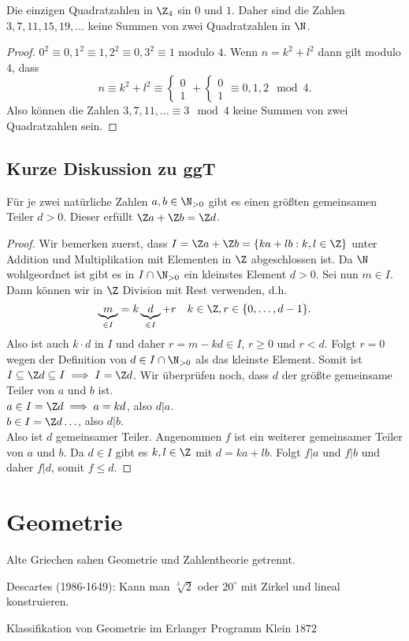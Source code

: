 \begin{lemma}
	Die einzigen Quadratzahlen in $\Z_4$ sin $0$ und $1$.
	Daher sind die Zahlen $3,7,11,15,19,\ldots$ keine Summen von zwei Quadratzahlen in $\N$.
\end{lemma}

\begin{proof}
	$0^2 \equiv 0, 1^2 \equiv 1, 2^2 \equiv 0, 3^2 \equiv 1$ modulo $4$.
	Wenn $n = k^2 + l^2$ dann gilt modulo $4$, dass
	\[
	n \equiv k^2 + l^2 \equiv \begin{cases}
		0\\ 1
	\end{cases}+\begin{cases}
		0\\ 1
	\end{cases} \equiv 0,1,2 \mod 4
	.\] 
	Also können die Zahlen $3,7,11,\ldots \equiv 3 \mod 4$ keine Summen von zwei Quadratzahlen sein.
\end{proof}

\subsection{Kurze Diskussion zu ggT}
\begin{proposition}
	Für je zwei natürliche Zahlen $a,b \in \N_{>0}$ gibt es einen größten gemeinsamen Teiler $d > 0$.
	Dieser erfüllt $\Z a + \Z b = \Z d$.
\end{proposition}

\begin{proof}
	Wir bemerken zuerst, dass $I = \Z a + \Z b = \{k a + l b: k,l \in \Z\} $ unter Addition und Multiplikation mit Elementen in $\Z$ abgeschlossen ist.
	Da $\N$ wohlgeordnet ist gibt es in $I \cap \N_{> 0}$ ein kleinstes Element $d > 0$.
	Sei nun $m \in I$. Dann können wir in $\Z$ Division mit Rest verwenden, d.h.
	\[
		\underbrace{m}_{\in I} = k\underbrace{d}_{\in I} + r \quad k \in \Z, r \in \{0,\ldots,d-1\} 
	.\] 
	Also ist auch $k \cdot d$ in $I$ und daher $r = m - kd \in I$, $r \geq 0$ und $r < d$. Folgt $r = 0$ wegen der Definition von $d \in I \cap \N_{>0}$ als das kleinste Element.
	Somit ist $I \subseteq \Z d \subseteq I \implies I = \Z d$.
	Wir überprüfen noch, dass $d$ der größte gemeinsame Teiler von $a$ und $b$ ist.\\
	$a \in I = \Z d \implies a = k d$, also $d \vert a$. \\
	$b \in I = \Z d \ldots$, also $d \vert b$.\\
	Also ist $d$ gemeinsamer Teiler. Angenommen $f$ ist ein weiterer gemeinsamer Teiler von $a$ und $b$.
	Da $d \in I$ gibt es $k,l \in \Z$ mit $d = k a + l b$. Folgt $f \vert a$ und $f \vert b$ und daher $f \vert d$, somit $f \leq d$.

\end{proof}

\section{Geometrie}
Alte Griechen sahen Geometrie und Zahlentheorie getrennt.

Descartes (1986-1649): Kann man $\sqrt[3]{2}$ oder $20^{\circ}$ mit Zirkel und lineal konstruieren.

Klassifikation von Geometrie im Erlanger Programm Klein $1872$














